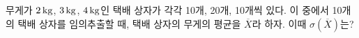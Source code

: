 무게가 $2\mkern3mu \mathrm{kg}$, $3\mkern3mu \mathrm{kg}$, $4\mkern3mu \mathrm{kg}$인 택배 상자가 각각 10개, 20개, 10개씩 있다. 이 중에서 10개의 택배 상자를 임의추출할 때, 택배 상자의 무게의 평균을 $\overline{X}$라 하자. 이때 $\sigma(\overline{X})$는?
